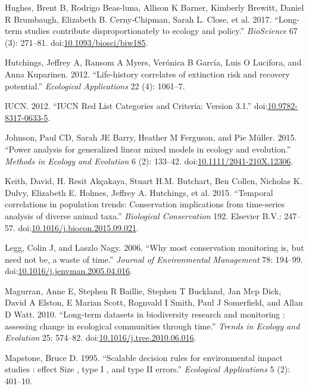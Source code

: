 \documentclass[12pt,]{article}
\begin{document}
\hypertarget{ref-Hughes2017}{}
Hughes, Brent B, Rodrigo Beas-luna, Allison K Barner, Kimberly Brewitt,
Daniel R Brumbaugh, Elizabeth B. Cerny-Chipman, Sarah L. Close, et al.
2017. ``Long-term studies contribute disproportionately to ecology and
policy.'' \emph{BioScience} 67 (3): 271--81.
doi:\href{https://doi.org/10.1093/biosci/biw185}{10.1093/biosci/biw185}.

\hypertarget{ref-Hutchings2012}{}
Hutchings, Jeffrey A, Ransom A Myers, Verónica B García, Luis O
Lucifora, and Anna Kuparinen. 2012. ``Life-history correlates of
extinction risk and recovery potential.'' \emph{Ecological Applications}
22 (4): 1061--7.

\hypertarget{ref-IUCN2012}{}
IUCN. 2012. ``IUCN Red List Categories and Criteria: Version 3.1.''
doi:\href{https://doi.org/10.9782-8317-0633-5}{10.9782-8317-0633-5}.

\hypertarget{ref-Johnson2015}{}
Johnson, Paul CD, Sarah JE Barry, Heather M Ferguson, and Pie Müller.
2015. ``Power analysis for generalized linear mixed models in ecology
and evolution.'' \emph{Methods in Ecology and Evolution} 6 (2): 133--42.
doi:\href{https://doi.org/10.1111/2041-210X.12306}{10.1111/2041-210X.12306}.

\hypertarget{ref-Keith2015}{}
Keith, David, H. Resit Akçakaya, Stuart H.M. Butchart, Ben Collen,
Nicholas K. Dulvy, Elizabeth E. Holmes, Jeffrey A. Hutchings, et al.
2015. ``Temporal correlations in population trends: Conservation
implications from time-series analysis of diverse animal taxa.''
\emph{Biological Conservation} 192. Elsevier B.V.: 247--57.
doi:\href{https://doi.org/10.1016/j.biocon.2015.09.021}{10.1016/j.biocon.2015.09.021}.

\hypertarget{ref-Legg2006}{}
Legg, Colin J, and Laszlo Nagy. 2006. ``Why most conservation monitoring
is, but need not be, a waste of time.'' \emph{Journal of Environmental
Management} 78: 194--99.
doi:\href{https://doi.org/10.1016/j.jenvman.2005.04.016}{10.1016/j.jenvman.2005.04.016}.

\hypertarget{ref-Magurran2010}{}
Magurran, Anne E, Stephen R Baillie, Stephen T Buckland, Jan Mcp Dick,
David A Elston, E Marian Scott, Rognvald I Smith, Paul J Somerfield, and
Allan D Watt. 2010. ``Long-term datasets in biodiversity research and
monitoring : assessing change in ecological communities through time.''
\emph{Trends in Ecology and Evolution} 25: 574--82.
doi:\href{https://doi.org/10.1016/j.tree.2010.06.016}{10.1016/j.tree.2010.06.016}.

\hypertarget{ref-Mapstone1995}{}
Mapstone, Bruce D. 1995. ``Scalable decision rules for environmental
impact studies : effect Size , type I , and type II errors.''
\emph{Ecological Applications} 5 (2): 401--10.
\end{document}
